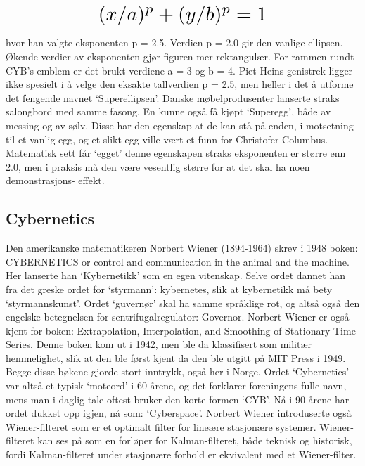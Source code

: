 \documentclass[../main.tex]{subfiles}
\begin{document}
\[ \scalebox{2}{$(x / a)^p + (y / b)^p = 1$} \]

hvor han valgte eksponenten p = 2.5. Verdien p = 2.0 gir den vanlige ellipsen. Økende verdier av eksponenten gjør figuren mer rektangulær. For rammen rundt CYB's emblem er det brukt verdiene a = 3 og b = 4. Piet Heins genistrek ligger ikke spesielt i å velge den eksakte tallverdien p = 2.5, men heller i det å utforme det fengende navnet `Superellipsen'. Danske møbelprodusenter lanserte straks salongbord med samme fasong. En kunne også få kjøpt `Superegg', både av messing og av sølv. Disse har den egenskap at de kan stå på enden, i motsetning til et vanlig egg, og et slikt egg ville vært et funn for Christofer Columbus. Matematisk sett får `egget' denne egenskapen straks eksponenten er større enn 2.0, men i praksis må den være vesentlig større for at det skal ha noen demonstrasjons- effekt.

\subsection{Cybernetics}
Den amerikanske matematikeren Norbert Wiener (1894-1964) skrev i 1948 boken: CYBERNETICS or control and communication in the animal and the machine. Her lanserte han `Kybernetikk' som en egen vitenskap. Selve ordet dannet han fra det greske ordet for `styrmann': kybernetes, slik at kybernetikk må bety `styrmannskunst'. Ordet `guvernør' skal ha samme språklige rot, og altså også den engelske betegnelsen for sentrifugalregulator: Governor. Norbert Wiener er også kjent for boken: Extrapolation, Interpolation, and Smoothing of Stationary Time Series. Denne boken kom ut i 1942, men ble da klassifisert som militær hemmelighet, slik at den ble først kjent da den ble utgitt på MIT Press i 1949. Begge disse bøkene gjorde stort inntrykk, også her i Norge. Ordet `Cybernetics' var altså et typisk `moteord' i 60-årene, og det forklarer foreningens fulle navn, mens man i daglig tale oftest bruker den korte formen `CYB'. Nå i 90-årene har ordet dukket opp igjen, nå som: `Cyberspace'. Norbert Wiener introduserte også Wiener-filteret som er et optimalt filter for lineære stasjonære systemer. Wiener-filteret kan ses på som en forløper for Kalman-filteret, både teknisk og historisk, fordi Kalman-filteret under stasjonære forhold er ekvivalent med et Wiener-filter.
\end{document}

